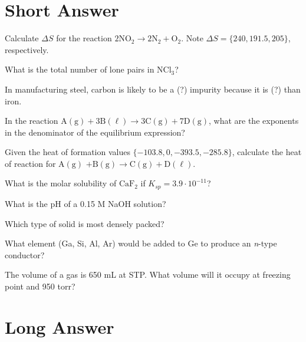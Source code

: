 \documentclass[answers]{exam}
\begin{document}
\section{Short Answer}

\begin{questions}

\question Calculate $\Delta S$ for the reaction $\mathrm{2NO_2 \to 2N_2 + O_2}$. Note $\Delta S = \{ 240, 191.5, 205 \}$, respectively.
\answerline[108]

\question What is the total number of lone pairs in $\mathrm{NCl_3}$?
\answerline[10]

\question In manufacturing steel, carbon is likely to be a (?) impurity because it is (?) than iron.

\question In the reaction $\mathrm{A(g) + 3 B(\ell) \to 3 C(g) + 7 D(g)}$, what are the exponents in the denominator of the equilibrium expression?
\answerline[1; 0]

\question Given the heat of formation values $\{-103.8, 0, -393.5, -285.8 \}$, calculate the heat of reaction for $\mathrm{A(g)}$ $\mathrm{ + B(g) \to C(g) + D(\ell)}$.

\question What is the molar solubility of $\mathrm{CaF_2}$ if $K_{sp} = 3.9 \cdot 10^{-11}$?

\question What is the pH of a 0.15 M NaOH solution?
\answerline[13.18]

\question Which type of solid is most densely packed?
\answerline[fcc]

\question What element (Ga, Si, Al, Ar) would be added to Ge to produce an \textit{n}-type conductor?
\answerline[Ar]

\question The volume of a gas is 650 mL at STP. What volume will it occupy at freezing point and 950 torr?
\answerline[520]

\end{questions}

\newpage
\section{Long Answer}
\end{document}
